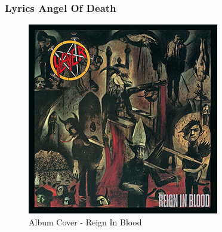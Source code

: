 \documentclass[twocolumn,10pt]{article}
\begin{document}
			\subsubsection{Lyrics Angel Of Death}\label{laod}
			\begin{figure}[H]
				\centering\includegraphics[width=\linewidth]{ReignInBlood.jpg}
				\caption{Album Cover - Reign In Blood\cite{aodLyrics}}
			\end{figure}
\end{document}
